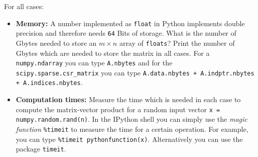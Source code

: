 For all cases:
\begin{itemize}
	\item \textbf{Memory:} A number implemented as \texttt{float} in Python implements double precision and therefore needs \texttt{64} Bits of storage. What is the number of Gbytes needed to store an $m \times n$ array of \texttt{floats}? Print the number of Gbytes which are needed to store the matrix in all cases. For a \verb|numpy.ndarray| you can type \verb|A.nbytes| and for the \texttt{scipy.sparse.csr\_matrix} you can type \texttt{A.data.nbytes + A.indptr.nbytes + A.indices.nbytes}.
	\item \textbf{Computation times:} Measure the time which is needed in each case to compute the matrix-vector product for a random input vector \verb|x = numpy.random.rand(n)|. In the IPython shell you can simply use the \textit{magic function} \verb|%timeit| to measure the time for a certain operation. For example, you can type \verb|%timeit pythonfunction(x)|. Alternatively you can use the package \verb|timeit|.
\end{itemize}

